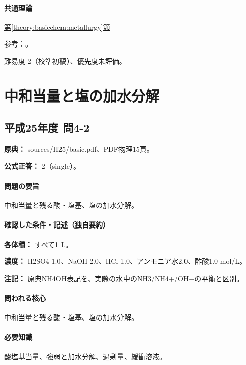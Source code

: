 \paragraph{共通理論} \hyperref[theory:basicchem:metallurgy]{第\ref*{theory:basicchem:metallurgy}節}

\par 参考：\cite{chem55_crust,chem55_iron}。

\par 難易度 2（校準初稿）、優先度未評価。

\section{中和当量と塩の加水分解}

\subsection{平成25年度 問4-2}
\label{q:h25-reg-basic-4-2}

\noindent\textbf{原典：} sources/H25/basic.pdf、PDF物理15頁。

\textbf{公式正答：} 2（single）。

\paragraph{問題の要旨} 中和当量と残る酸・塩基、塩の加水分解。

\paragraph{確認した条件・記述（独自要約）}\mbox{}\par

\noindent\textbf{各体積：} すべて1 L。\par

\noindent\textbf{濃度：} H2SO4 1.0、NaOH 2.0、HCl 1.0、アンモニア水2.0、酢酸1.0 mol/L。\par

\noindent\textbf{注記：} 原典NH4OH表記を、実際の水中のNH3/NH4+/OH−の平衡と区別。\par

\paragraph{問われる核心} 中和当量と残る酸・塩基、塩の加水分解。

\paragraph{必要知識} 酸塩基当量、強弱と加水分解、過剰量、緩衝溶液。

